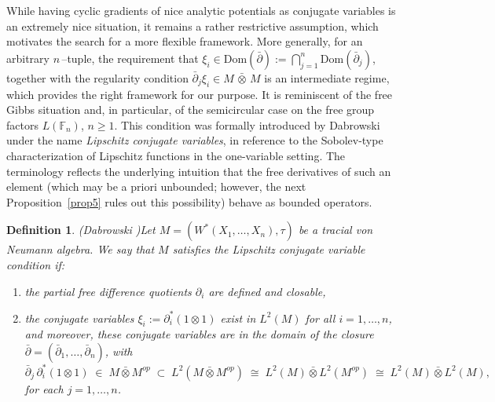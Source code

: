 \documentclass[10pt,a4paper,reqno]{amsart}
\newtheorem{definition}[theorem]{Definition}
\newcommand{\Dom}{\mathrm{Dom}}
\begin{document}
\bigbreak
While having cyclic gradients of nice analytic potentials as conjugate variables is an extremely nice situation, it remains a rather restrictive assumption, which motivates the search for a more flexible framework. More generally, for an arbitrary $n$\,--tuple, the requirement that $
\xi_i \in \Dom(\bar{\partial}) := \bigcap_{j=1}^n \Dom(\bar{\partial}_j)
$, together with the regularity condition
$\bar{\partial}_j \xi_i \in M \,\bar{\otimes}\, M
$
is an intermediate regime, which provides the right framework for our purpose. It is reminiscent of the free Gibbs situation and, in particular, of the semicircular case on the free group factors $L(\mathbb{F}_n)$, $n \ge 1$. This condition was formally introduced by Dabrowski~\cite{Dab14} under the name \emph{Lipschitz conjugate variables}, in reference to the Sobolev-type characterization of Lipschitz functions in the one-variable setting. The terminology reflects the underlying intuition that the free derivatives of such an element (which may be a priori unbounded; however, the next Proposition~\ref{prop5} rules out this possibility) behave as bounded operators.



    
    \begin{definition}(Dabrowski \cite[Definition 1]{Dab14})\label{def6}
Let \({M} = (W^*(X_1,\ldots,X_n), \tau)\) be a tracial von Neumann algebra.  
We say that \(M\) satisfies the \emph{Lipschitz conjugate variable condition} if:

\begin{enumerate}
  \item the partial free difference quotients \(\partial_i\) are defined and closable,
  \item the conjugate variables $\xi_i:=\partial_i^*(1 \otimes 1)$ exist in \(L^2(M)\) for all \(i=1,\ldots,n\),
and moreover, these conjugate variables are in the domain of the closure 
  \(\bar{\partial} = (\bar{\partial}_1,\ldots,\bar{\partial}_n)\), with \[
     \bar{\partial}_j \, \partial_i^*(1 \otimes 1) \;\in\; {M} \bar{\otimes} {M}^{op} 
     \;\subset\; L^2({M} \bar{\otimes} {M}^{op}) \;\cong\; L^2({M}) \bar{\otimes} L^2({M}^{op}) \;\cong\; L^2({M}) \bar{\otimes} L^2({M}),
  \] for each $j=1,\ldots,n$.
\end{enumerate}
\end{definition}
\end{document}
